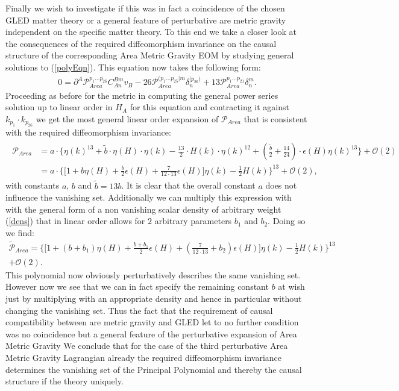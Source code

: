 \documentclass[a4paper,12pt, DIV=14, BCOR=5mm, twoside, headsepline, numbers=noenddot]{scrbook}
\begin{document}
Finally we wish to investigate if this was in fact a coincidence of the chosen GLED matter theory or a general feature of perturbative are metric gravity independent on the specific matter theory. To this end we  take a closer look at the consequences of the required diffeomorphism invariance on the causal structure of the corresponding Area Metric Gravity EOM by studying general solutions to (\ref{polyEqn}). This equation now takes the following form:
\begin{align}\label{AreaPolyEqn}
    0 = \partial^A \mathcal{P}_{Area}^{p_1...p_26} C_{An}^{Bm} v_B - 26\mathcal{P}_{Area}^{(p_1...p_{25}\vert m} \delta_n^{\vert p_{26})} + 13 \mathcal{P}_{Area}^{p_1...p_21} \delta^m_n.
\end{align}
Proceeding as before for the metric in computing the general power series solution up to linear order in $H_A$ for this equation and contracting it against $k_{p_1} \cdot k_{p_{26}}$ we get the most general linear order expansion of $\mathcal{P}_{Area}$ that is consistent with the required diffeomorphism invariance:
\begin{align}
\begin{aligned}
    \mathcal{P}_{Area} &= a \cdot \bigl \{  \eta(k)^{13} + \tilde{b} \cdot \eta(H) \cdot \eta(k) - \frac{13}{2} \cdot  H(k) \cdot \eta(k)^{12} + (\frac{\tilde{b}}{2}+\frac{14}{24}) \cdot \epsilon(H) \eta(k)^{13}  \bigr \} + \mathcal{O}(2)\\
    &=a \cdot \bigl\{  \bigl[ 1 + b \eta(H) + \frac{b}{2} \epsilon(H) +  \frac{7}{12\cdot13} \epsilon(H) \bigr] \eta(k) - \frac{1}{2} H(k)       \bigr\}^{13} + \mathcal{O}(2),
\end{aligned}
\end{align}
with constants $a$, $b$ and $\tilde{b} = 13b$. It is clear that the overall constant $a$ does not influence the vanishing set. Additionally we can multiply this expression with with the general form of a non vanishing scalar density of arbitrary weight (\ref{dens}) that in linear order allows for $2$ arbitrary parameters $b_1$ and $b_2$. Doing so we find:
\begin{multline}
    \tilde{\mathcal{P}}_{Area} = \bigl\{  \bigl[ 1 + (b+ b_1) \eta(H) + \frac{b+b_1}{2} \epsilon(H) +  (\frac{7}{12\cdot13}+b_2) \epsilon(H) \bigr] \eta(k) - \frac{1}{2} H(k)       \bigr\}^{13} \\
    + \mathcal{O}(2).
\end{multline}
This polynomial now obviously perturbatively describes the same vanishing set. However now we see that we can in fact specify the remaining constant $b$ at wish just by multiplying with an appropriate density and hence in particular without changing the vanishing set. 
Thus the fact that the requirement of causal compatibility between are metric gravity and GLED let to no further condition was no coincidence but a general feature of the perturbative expansion of Area Metric Gravity
We conclude that for the case of the third perturbative Area Metric Gravity Lagrangian already the required diffeomorphism invariance determines the vanishing set of the Principal Polynomial and thereby the causal structure if the theory uniquely. \\
\end{document}
